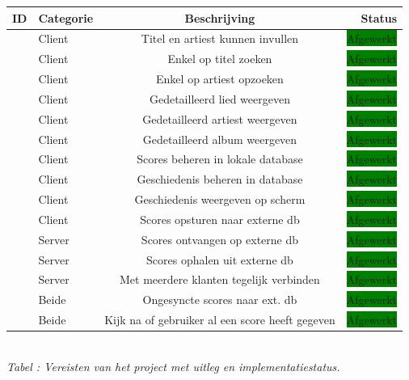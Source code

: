 \documentclass[11pt,a4paper]{article}
\newcommand{\boxgreen}{\colorbox{green}{\color{black}Afgewerkt}}
\newcommand{\boxyellow}{\colorbox{yellow}{\color{black}Aan bezig}}
\newcommand{\boxred}{\colorbox{red}{\color{black}Onafgewerkt}}
\newcounter{reqc}
\newcommand{\reqID} {%
   \stepcounter{reqc}%
   \thereqc}
\newcounter{tabc}
\newcommand{\increaseTabID} {%
   \stepcounter{tabc}%
   \thetabc}
\newcommand{\tabID}[1]{\small \textit{Tabel \increaseTabID : #1} \\ \normalsize}
\begin{document}
	\begin{tabular}{| l | l | c | r |}
	\hline
	ID 		& 	Categorie	&	Beschrijving						& Status 		\\ \hline \hline
	\reqID	&	Client		&	Titel en artiest kunnen invullen	& \boxgreen 	\\ \hline
	\reqID 	&	Client		&	Enkel op titel zoeken				& \boxgreen		\\ \hline
	\reqID	& 	Client		&	Enkel op artiest opzoeken 			& \boxgreen		\\ \hline
	\reqID 	& 	Client		&	Gedetailleerd lied weergeven		& \boxgreen 	\\ \hline
	\reqID 	& 	Client		&	Gedetailleerd artiest weergeven		& \boxgreen 	\\ \hline
	\reqID 	& 	Client		&	Gedetailleerd album weergeven		& \boxgreen 	\\ \hline
	\reqID	& 	Client		&	Scores beheren in lokale database	& \boxgreen  	\\ \hline
	\reqID	& 	Client		&	Geschiedenis beheren in database	& \boxgreen  	\\ \hline
	\reqID	& 	Client		&	Geschiedenis weergeven op scherm	& \boxgreen  	\\ \hline
	\reqID	& 	Client		&	Scores opsturen naar externe db		& \boxgreen		\\ \hline
	\reqID	& 	Server		&	Scores ontvangen op externe db		& \boxgreen		\\ \hline
	\reqID	&	Server		&	Scores ophalen uit externe db		& \boxgreen		\\ \hline
	\reqID	& 	Server		& 	Met meerdere klanten tegelijk verbinden	& \boxgreen		\\ \hline
	\reqID	& 	Beide		& 	Ongesyncte scores naar ext. db		& \boxgreen		\\ \hline
	\reqID	&	Beide		&	Kijk na of gebruiker al een score heeft gegeven	& \boxgreen		\\ \hline
	
	\end{tabular} \\ \newline
	\tabID{Vereisten van het project met uitleg en implementatiestatus.} 
	
\end{document}

